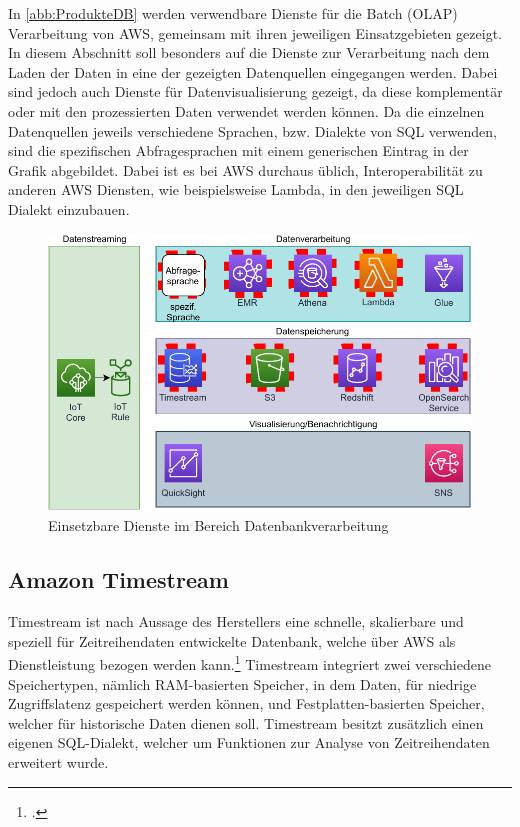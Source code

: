 In \autoref{abb:ProdukteDB} werden verwendbare Dienste für die Batch (\ac{OLAP}) Verarbeitung von \ac{AWS}, gemeinsam mit ihren jeweiligen Einsatzgebieten gezeigt. In diesem Abschnitt soll besonders auf die Dienste zur Verarbeitung nach dem Laden der Daten in eine der gezeigten Datenquellen eingegangen werden. Dabei sind jedoch auch Dienste für Datenvisualisierung gezeigt, da diese komplementär oder mit den prozessierten Daten verwendet werden können. Da die einzelnen Datenquellen jeweils verschiedene Sprachen, bzw. Dialekte von \ac{SQL} verwenden, sind die spezifischen Abfragesprachen mit einem generischen Eintrag in der Grafik abgebildet. Dabei ist es bei \ac{AWS} durchaus üblich, Interoperabilität zu anderen \ac{AWS} Diensten, wie beispielsweise Lambda, in den jeweiligen \ac{SQL} Dialekt einzubauen.

\begin{figure}[H]
\centering
\includegraphics[width=\textwidth]{graphics/Overview-DB.pdf}
\caption{Einsetzbare Dienste im Bereich Datenbankverarbeitung}
\label{abb:ProdukteDB}
\end{figure}

\subsection{Amazon Timestream}\label{subsection:Amazon-Timestrea}
Timestream ist nach Aussage des Herstellers eine schnelle, skalierbare und speziell für Zeitreihendaten entwickelte Datenbank, welche über \ac{AWS} als Dienstleistung bezogen werden kann.\footcite[Vgl. auch im Folgenden][]{AmazonWebServicesInc..o.J.h} Timestream integriert zwei verschiedene Speichertypen, nämlich \ac{RAM}-basierten Speicher, in dem Daten, für niedrige Zugriffslatenz gespeichert werden können, und Festplatten-basierten Speicher, welcher für historische Daten dienen soll.
Timestream besitzt zusätzlich einen eigenen \ac{SQL}-Dialekt, welcher um Funktionen zur Analyse von Zeitreihendaten erweitert wurde. 

